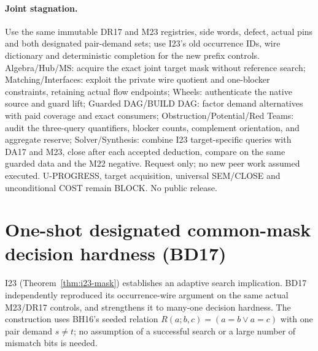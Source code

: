 \documentclass[11pt]{article}
\begin{document}
\paragraph{Joint stagnation.}
Use the same immutable DR17 and M23 registries, side words, defect, actual pins and both designated pair-demand sets; use I23's old occurrence IDs, wire dictionary and deterministic completion for the new prefix controls. Algebra/Hub/MS: acquire the exact joint target mask without reference search; Matching/Interfaces: exploit the private wire quotient and one-blocker constraints, retaining actual flow endpoints; Wheels: authenticate the native source and guard lift; Guarded DAG/BUILD DAG: factor demand alternatives with paid coverage and exact consumers; Obstruction/Potential/Red Teams: audit the three-query quantifiers, blocker counts, complement orientation, and aggregate reserve; Solver/Synthesis: combine I23 target-specific queries with DA17 and M23, close after each accepted deduction, compare on the same guarded data and the M22 negative. Request only; no new peer work assumed executed. U-PROGRESS, target acquisition, universal SEM/CLOSE and unconditional COST remain BLOCK. No public release.


\section{One-shot designated common-mask decision hardness (BD17)}\label{sec:bd17}
I23 (Theorem~\ref{thm:i23-mask}) establishes an adaptive search implication. BD17 independently reproduced its occurrence-wire argument on the same actual M23/DR17 controls, and strengthens it to many-one decision hardness. The construction uses BH16's seeded relation $R(a;b,c)=(a=b\lor a=c)$ with one pair demand $s\ne t$; no assumption of a successful search or a large number of mismatch bits is needed.
\end{document}
